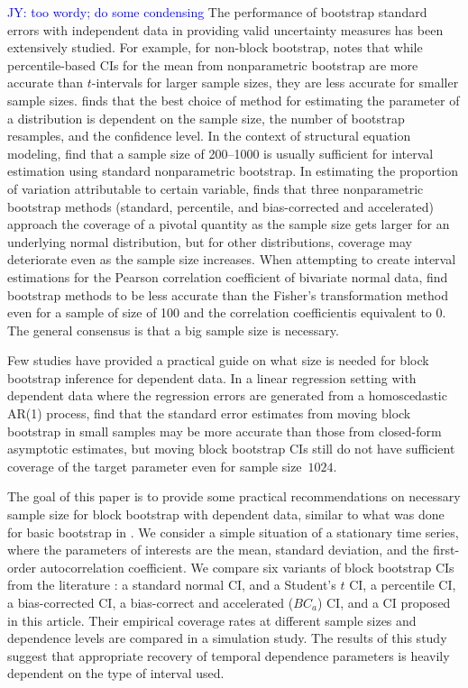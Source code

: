 \documentclass[12pt, letterpaper, titlepage]{article}
\newcommand{\jy}[1]{\textcolor{blue}{JY: #1}}
\begin{document}
\jy{too wordy; do some condensing}
The performance of bootstrap standard errors with independent data
in providing valid uncertainty measures has been extensively studied.
For example, for non-block bootstrap, \citet{hesterberg2015teachers} notes
that while percentile-based CIs for the mean from nonparametric bootstrap
are more accurate than $t$-intervals for larger sample sizes, they are
less accurate for smaller sample sizes. \citet{chernick2009revisiting} finds 
that the best choice of method for estimating
the parameter of a distribution is dependent on the sample size, the number of
bootstrap resamples, and the confidence level. In the context of structural
equation modeling, \citet{nevitt2001performance} find
that a sample size of 200--1000 is usually sufficient for interval estimation
using standard nonparametric bootstrap. In estimating the proportion of 
variation attributable to certain variable, \citet{burch2012nonparametric} finds
that three nonparametric bootstrap methods (standard, percentile, and bias-corrected
and accelerated) approach the coverage of a pivotal quantity as the sample size
gets larger for an underlying normal distribution, but for other distributions, 
coverage may deteriorate even as the sample size increases.
When attempting to create interval estimations for the Pearson correlation 
coefficient of bivariate normal data, \citet{puth2015variety} find bootstrap 
methods to be less accurate than the Fisher's transformation method even 
for a sample of size of 100 and the correlation coefficientis equivalent to 0.
The general consensus is that a big sample size is necessary.



Few studies have provided a practical guide on what size is needed
for block bootstrap inference for dependent data.
In a linear regression setting with dependent data where the
regression errors are generated from a homoscedastic AR(1) process, 
\citet{goncalves2005bootstrap} find that the standard error estimates from
moving block bootstrap in small samples may be more accurate than those
from closed-form asymptotic estimates, but moving block bootstrap 
CIs still do not have sufficient coverage of the target parameter even for
sample size~$1024$.


The goal of this paper is to provide some practical recommendations on
necessary sample size for block bootstrap with dependent data, similar to what 
was done for basic bootstrap in \citet{hesterberg2015teachers}. We consider a
simple situation of a stationary time series, where the parameters of
interests are the mean, standard deviation, and the first-order
autocorrelation coefficient. We compare six variants of block bootstrap
CIs from the literature \citep{diciccio1996bootstrap,
  rice2006mathematical}: a standard normal CI, and a Student's $t$ CI,
a percentile CI, a bias-corrected CI, a bias-correct and accelerated ($BC_a$)
CI, and a CI proposed in this article. Their
empirical coverage rates at different sample sizes and dependence levels are
compared in a simulation study. The results of this study suggest that
appropriate recovery of temporal dependence parameters is heavily dependent on
the type of interval used.
\end{document}
